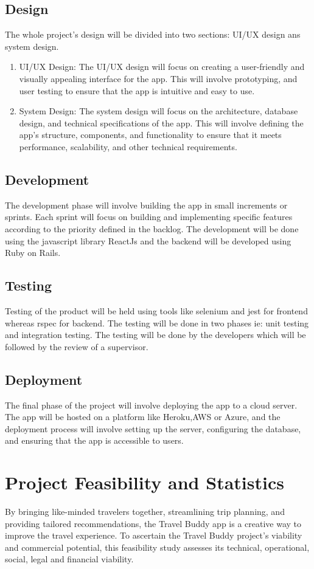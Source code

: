 \documentclass[12pt,a4paper]{report}
\begin{document}
\section{Design}
The whole project's design will be divided into two sections: UI/UX design ans system design.
\begin{enumerate}
    \item UI/UX Design: The UI/UX design will focus on creating a user-friendly and visually appealing interface for the app. This will involve prototyping, and user testing to ensure that the app is intuitive and easy to use.
    \item System Design: The system design will focus on the architecture, database design, and technical specifications of the app. This will involve defining the app's structure, components, and functionality to ensure that it meets performance, scalability, and other technical requirements.
\end{enumerate}

\section{Development}
The development phase will involve building the app in small increments or sprints. Each sprint will focus on building and implementing specific features according to the priority defined in the backlog. The development will be done using the javascript library ReactJs and the backend will be developed using Ruby on Rails.

\section{Testing}
Testing of the product will be held using tools like selenium and jest for frontend whereas rspec for backend. The testing will be done in two phases ie: unit testing and integration testing. The testing will be done by the developers which will be followed by the review of a supervisor.

\section{Deployment}
The final phase of the project will involve deploying the app to a cloud server. The app will be hosted on a platform like Heroku,AWS or Azure, and the deployment process will involve setting up the server, configuring the database, and ensuring that the app is accessible to users.

\chapter{Project Feasibility  and Statistics}
By bringing like-minded travelers together, streamlining trip planning, and providing tailored recommendations, the Travel Buddy app is a creative way to improve the travel experience. To ascertain the Travel Buddy project's viability and commercial potential, this feasibility study assesses its technical, operational, social, legal and financial viability.
\end{document}
